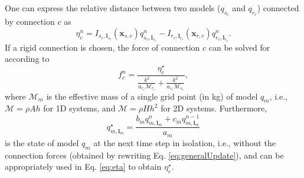 \documentclass{article}
\begin{document}
One can express the relative distance between two models ($q_{s_c}$ and $q_{r_c}$) connected by connection $c$ as
\begin{equation}\label{eq:eta}
    \eta_c^n =  I_{s_c,\boldsymbol{l}_{s_c}}(\boldsymbol{x}_{s,c})q_{s_c, \boldsymbol{l}_{s_c}}^n - I_{r_c,\boldsymbol{l}_{r_c}}(\boldsymbol{x}_{r,c})q_{r_c, \boldsymbol{l}_{r_c}}^n.
\end{equation}
If a rigid connection is chosen, the force of connection $c$ can be solved for according to
\begin{equation}\label{eq:rigidConnDisc}
    f_c^n = \frac{\eta^\star_c}{ \frac{k^2}{a_{r_c}\mathcal{M}_{r_c}} + \frac{k^2}{a_{s_c}\mathcal{M}_{s_c}}},
\end{equation}
where $\mathcal{M}_m$ is the effective mass of a single grid point (in kg) of model $q_m$, i.e., $\mathcal{M} = \rho A h$ for 1D systems, and $\mathcal{M} = \rho H h^2$ for 2D systems. Furthermore, 
\begin{equation}
    q_{m,\boldsymbol{l}_m}^\star = \frac{b_m q_{m,\boldsymbol{l}_m}^n + c_m q_{m,\boldsymbol{l}_m}^{n-1}}{a_m}
\end{equation}
is the state of model $q_m$ at the next time step in isolation,  i.e., without the connection forces (obtained by rewriting Eq. \eqref{eq:generalUpdate}), and can be appropriately used in Eq. \eqref{eq:eta} to obtain $\eta_c^\star$.
\end{document}
